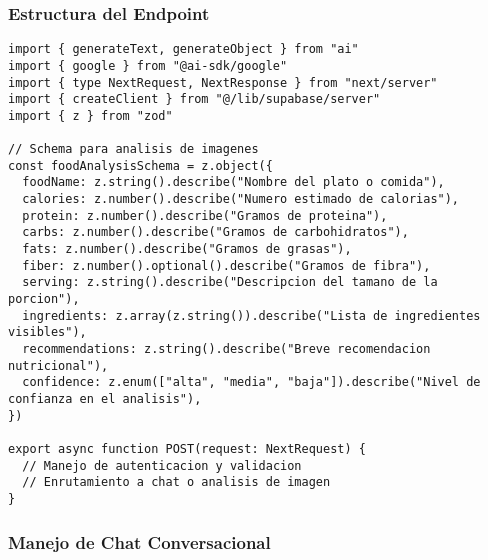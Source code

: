 \documentclass[12pt,a4paper]{article}
\begin{document}
\subsubsection{Estructura del Endpoint}

\begin{lstlisting}[caption=Estructura basica del endpoint /api/chat]
import { generateText, generateObject } from "ai"
import { google } from "@ai-sdk/google"
import { type NextRequest, NextResponse } from "next/server"
import { createClient } from "@/lib/supabase/server"
import { z } from "zod"

// Schema para analisis de imagenes
const foodAnalysisSchema = z.object({
  foodName: z.string().describe("Nombre del plato o comida"),
  calories: z.number().describe("Numero estimado de calorias"),
  protein: z.number().describe("Gramos de proteina"),
  carbs: z.number().describe("Gramos de carbohidratos"),
  fats: z.number().describe("Gramos de grasas"),
  fiber: z.number().optional().describe("Gramos de fibra"),
  serving: z.string().describe("Descripcion del tamano de la porcion"),
  ingredients: z.array(z.string()).describe("Lista de ingredientes visibles"),
  recommendations: z.string().describe("Breve recomendacion nutricional"),
  confidence: z.enum(["alta", "media", "baja"]).describe("Nivel de confianza en el analisis"),
})

export async function POST(request: NextRequest) {
  // Manejo de autenticacion y validacion
  // Enrutamiento a chat o analisis de imagen
}
\end{lstlisting}

\subsubsection{Manejo de Chat Conversacional}
\end{document}
